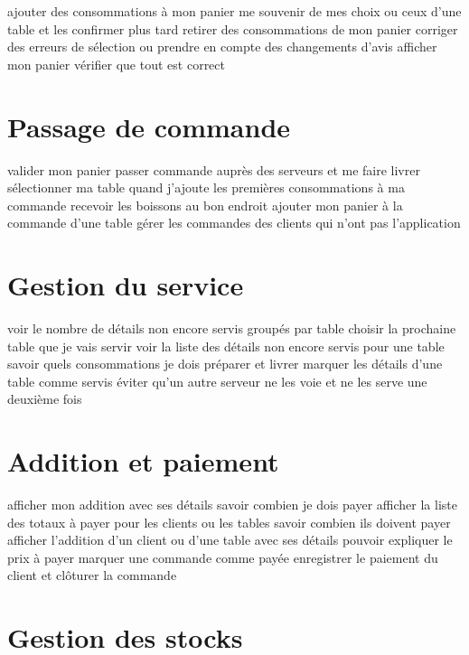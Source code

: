 \documentclass[a4paper,10pt]{article}
\begin{document}
{ajouter des consommations à mon panier}
{me souvenir de mes choix ou ceux d'une table et les confirmer plus tard}
{retirer des consommations de mon panier}
{corriger des erreurs de sélection ou prendre en compte des changements d'avis}
{afficher mon panier}
{vérifier que tout est correct}

\section{Passage de commande}

{valider mon panier}
{passer commande auprès des serveurs et me faire livrer}
{sélectionner ma table quand j'ajoute les premières consommations à ma commande}
{recevoir les boissons au bon endroit}
{ajouter mon panier à la commande d'une table}
{gérer les commandes des clients qui n'ont pas l'application}

\section{Gestion du service}

{voir le nombre de détails non encore servis groupés par table}
{choisir la prochaine table que je vais servir}
{voir la liste des détails non encore servis pour une table}
{savoir quels consommations je dois préparer et livrer}
{marquer les détails d'une table comme servis}
{éviter qu'un autre serveur ne les voie et ne les serve une deuxième fois}

\section{Addition et paiement}

{afficher mon addition avec ses détails}
{savoir combien je dois payer}
{afficher la liste des totaux à payer pour les clients ou les tables}
{savoir combien ils doivent payer}
{afficher l'addition d'un client ou d'une table avec ses détails}
{pouvoir expliquer le prix à payer}
{marquer une commande comme payée}
{enregistrer le paiement du client et clôturer la commande}

\section{Gestion des stocks}
\end{document}
